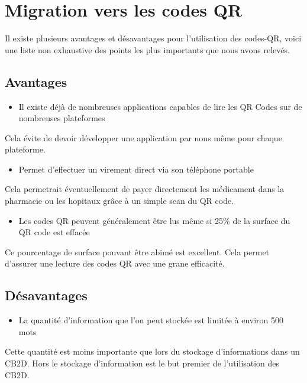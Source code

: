 \newpage

\section{Migration vers les codes QR}

Il existe plusieurs avantages et désavantages pour l'utilisation des codes-QR, voici une liste non exhaustive des points les plus importants que nous avons relevés.

\subsection{Avantages}

\begin{itemize}
\item Il existe déjà de nombreuses applications capables de lire les QR Codes sur de nombreuses plateformes
\end{itemize}
Cela évite de devoir développer une application par nous même pour chaque plateforme.

\begin{itemize}
\item Permet d'effectuer un virement direct via son téléphone portable
\end{itemize}
Cela permetrait éventuellement de payer directement les médicament dans la pharmacie ou les hopitaux grâce à un simple scan du QR code.

\begin{itemize}
\item Les codes QR peuvent généralement être lus même si 25$\%$ de la surface du QR code est effacée
\end{itemize}
Ce pourcentage de surface pouvant être abimé est excellent. Cela permet d'assurer une lecture des codes QR avec une grane efficacité.


\subsection{Désavantages}

\begin{itemize}
\item La quantité d'information que l'on peut stockée est limitée à environ 500 mots
\end{itemize}
Cette quantité est moins importante que lors du stockage d'informations dans un CB2D. Hors le stockage d'information est le but premier de l'utilisation des CB2D.